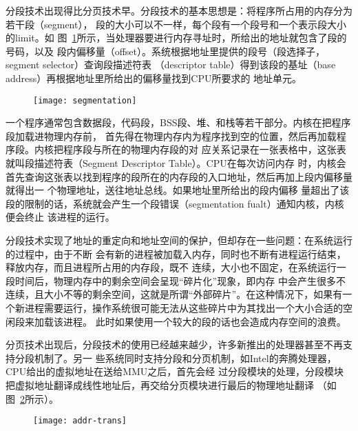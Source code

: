 \documentclass{swfuthesism}
\begin{document}
分段技术出现得比分页技术早。分段技术的基本思想是：将程序所占用的内存分为若干段（segment），
段的大小可以不一样，每个段有一个段号和一个表示段大小的limit\cite{duarte:mem}。如
图~\ref{fig:segmentation}所示，当处理器要进行内存寻址时，所给出的地址就包含了段的号码，以及
段内偏移量（offset）。系统根据地址里提供的段号（段选择子，segment selector）查询段描述符表
（descriptor table）得到该段的基址（base address）再根据地址里所给出的偏移量找到CPU所要求的
地址单元。

\begin{figure}[!ht]
  \centering
  \texttt{[image: segmentation]}
  \label{fig:segmentation}
\end{figure}

一个程序通常包含数据段，代码段，BSS段、堆、和栈等若干部分。内核在把程序段加载进物理内存前，
首先得在物理内存内为程序找到空的位置，然后再加载程序段。内核把程序段与所在的物理内存段的对
应关系记录在一张表格中，这张表就叫段描述符表（Segment Descriptor Table）。CPU在每次访问内存
时，内核会首先查询这张表以找到程序的段所在的内存段的入口地址，然后再加上段内偏移量就得出一
个物理地址，送往地址总线\cite{brey2009intel,x86assemblymanual}。如果地址里所给出的段内偏移
量超出了该段的限制的话，系统就会产生一个段错误（segmentation fualt）通知内核，内核便会终止
该进程的运行。

分段技术实现了地址的重定向和地址空间的保护，但却存在一些问题：在系统运行的过程中，由于不断
会有新的进程被加载入内存，同时也不断有进程运行结束，释放内存，而且进程所占用的内存段，既不
连续，大小也不固定，在系统运行一段时间后，物理内存中的剩余空间会呈现``碎片化''现象，即内存
中会产生很多不连续，且大小不等的剩余空间，这就是所谓``外部碎片''。在这种情况下，如果有一
个新进程需要运行，操作系统很可能无法从这些碎片中为其找出一个大小合适的空闲段来加载该进程。
此时如果使用一个较大的段的话也会造成内存空间的浪费。

分页技术出现后，分段技术的使用已经越来越少，许多新推出的处理器甚至不再支持分段机制了。另一
些系统同时支持分段和分页机制，如Intel的奔腾处理器，CPU给出的虚拟地址在送给MMU之后，首先会经
过分段模块的处理，分段模块把虚拟地址翻译成线性地址后，再交给分页模块进行最后的物理地址翻译
（如图~\ref{fig:addr-trans}所示）。

\begin{figure}[!ht]
  \centering
  \texttt{[image: addr-trans]}
  \label{fig:addr-trans}
\end{figure}
\end{document}
